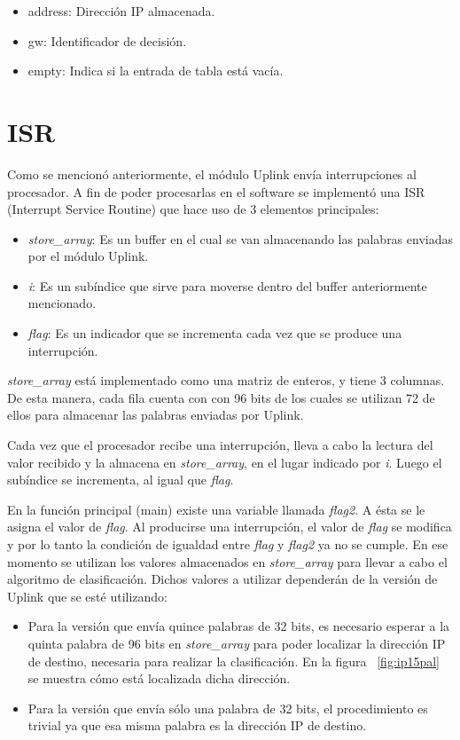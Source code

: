 \begin{itemize}
	\item address: Dirección IP almacenada.
	\item gw: Identificador de decisión.
	\item empty: Indica si la entrada de tabla está vacía.
\end{itemize}

\section{ISR}

Como se mencionó anteriormente, el módulo Uplink envía interrupciones al procesador. A fin de poder procesarlas en el software se implementó una ISR (Interrupt Service Routine) que hace uso de 3 elementos principales:

\begin{itemize}
	\item \textit{store\_array}: Es un buffer en el cual se van almacenando las palabras enviadas por el módulo Uplink.
	\item \textit{i}: Es un subíndice que sirve para moverse dentro del buffer anteriormente mencionado.
	\item \textit{flag}: Es un indicador que se incrementa cada vez que se produce una interrupción.
\end{itemize}

\textit{store\_array} está implementado como una matriz de enteros, y tiene 3 columnas. De esta manera, cada fila cuenta con con 96 bits de los cuales se utilizan 72 de ellos para almacenar las palabras enviadas por Uplink.

Cada vez que el procesador recibe una interrupción, lleva a cabo la lectura del valor recibido y la almacena en \textit{store\_array}, en el lugar indicado por \textit{i}. Luego el subíndice se incrementa, al igual que \textit{flag}.

En la función principal (main) existe una variable llamada \textit{flag2}. A ésta se le asigna el valor de \textit{flag}. Al producirse una interrupción, el valor de \textit{flag} se modifica y por lo tanto la condición de igualdad entre \textit{flag} y \textit{flag2} ya no se cumple. En ese momento se utilizan los valores almacenados en \textit{store\_array} para llevar a cabo el algoritmo de clasificación. Dichos valores a utilizar dependerán de la versión de Uplink que se esté utilizando:

\begin{itemize}
	\item Para la versión que envía quince palabras de 32 bits, es necesario esperar a la quinta palabra de 96 bits en \textit{store\_array} para poder localizar la dirección IP de destino, necesaria para realizar la clasificación. En la figura ~\ref{fig:ip15pal} se muestra cómo está localizada dicha dirección. 
	\item Para la versión que envía sólo una palabra de 32 bits, el procedimiento es trivial ya que esa misma palabra es la dirección IP de destino.
\end{itemize}


